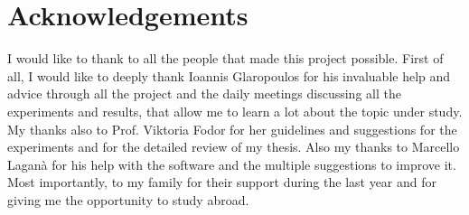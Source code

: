 \chapter*{Acknowledgements}
\thispagestyle{begin}
I would like to thank to all the people that made this project possible. First of all, I would like to deeply thank Ioannis Glaropoulos for his invaluable help and advice through all the project and the daily meetings discussing all the experiments and results, that allow me to learn a lot about the topic under study. My thanks also to Prof. Viktoria Fodor for her guidelines and suggestions for the experiments and for the detailed review of my thesis. Also my thanks to Marcello Laganà for his help with the software and the multiple suggestions to improve it. Most importantly, to my family for their support during the last year and for giving me the opportunity to study abroad.